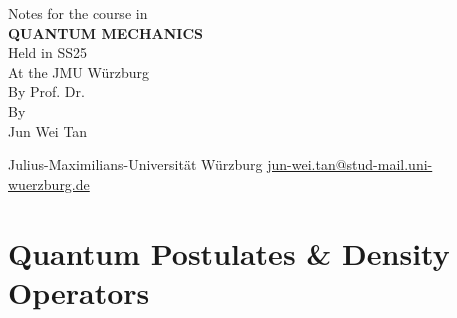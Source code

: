 \documentclass[twoside,symmetric, openany, 12pt]{./tuftebook}
\theoremstyle{definition}
\theoremstyle{definition}
\theoremstyle{definition}
\begin{document}
	\begin{titlepage}
		{\begingroup%
			\centering
			{\Large Notes for the course in}\\[\baselineskip]
			{\Huge\bfseries QUANTUM MECHANICS}\\[\baselineskip]
			{\Large Held in SS25\\ At the JMU Würzburg\\ By Prof. Dr. }\\[\baselineskip]
			{\LARGE By}\\[\baselineskip]
			{\LARGE Jun Wei Tan}\par
			\vfill
			{Julius-Maximilians-Universit\"{a}t W\"{u}rzburg}
			\vfill
			{\small\sffamily \href{mailto:jun-wei.tan@stud-mail.uni-wuerzburg.de}{jun-wei.tan@stud-mail.uni-wuerzburg.de}}\par
			\endgroup}
	\end{titlepage}
	\restoregeometry
	\tableofcontents
\chapter{Quantum Postulates \& Density Operators}
\end{document}
